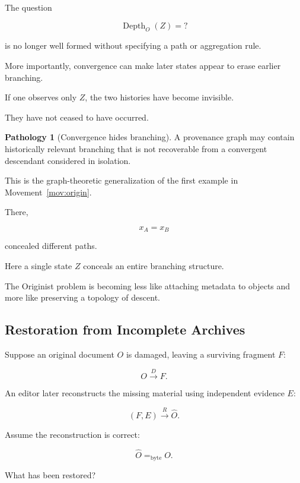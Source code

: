 \documentclass[
  11pt,
  a4paper,
  DIV=12,
  BCOR=0mm,
  parskip=half-
]{scrartcl}
\newcommand{\eqbyte}{=_{\mathrm{byte}}}
\newcommand{\Depth}{\operatorname{Depth}}
\theoremstyle{definition}
\newtheorem{pathology}[definition]{Pathology}
\theoremstyle{plain}
\theoremstyle{remark}
\begin{document}
The question

\[
  \Depth_O(Z)=?
\]

is no longer well formed without specifying a path or aggregation rule.

More importantly, convergence can make later states appear to erase earlier
branching.

If one observes only \(Z\), the two histories have become invisible.

They have not ceased to have occurred.

\begin{pathology}[Convergence hides branching]
\label{path:convergence-hides}
A provenance graph may contain historically relevant branching that is not
recoverable from a convergent descendant considered in isolation.
\end{pathology}

This is the graph-theoretic generalization of the first example in
Movement~\ref{mov:origin}.

There,

\[
  x_A=x_B
\]

concealed different paths.

Here a single state \(Z\) conceals an entire branching structure.

The Originist problem is becoming less like attaching metadata to objects and
more like preserving a topology of descent.


\subsection{Restoration from Incomplete Archives}
\label{sec:restoration}

Suppose an original document \(O\) is damaged, leaving a surviving fragment
\(F\):

\[
  O
  \xrightarrow{D}
  F.
\]

An editor later reconstructs the missing material using independent evidence
\(E\):

\[
  (F,E)
  \xrightarrow{R}
  \widehat O.
\]

Assume the reconstruction is correct:

\[
  \widehat O\eqbyte O.
\]

What has been restored?
\end{document}
